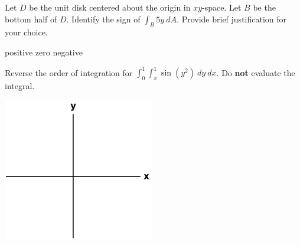 \documentclass[12pt,letterpaper,noanswers]{exam}
\begin{document}
 \pdfpageheight 11in 
  \pdfpagewidth 8.5in



\begin{questions}
\item Let $D$ be the unit disk centered about the origin in $xy$-space.  Let $B$ be the bottom half of $D$.  Identify the sign of $\displaystyle\int_B 5y\ dA$.  Provide brief justification for your choice.

\begin{oneparcheckboxes}
\choice positive
\choice zero
\choice negative
\end{oneparcheckboxes}

\vfill

\item Reverse the order of integration for 
$\displaystyle\int_0^1\int_{x}^1 \sin(y^2)\ dy\ dx$.  Do \textbf{not} evaluate the integral.

\includegraphics[height=2.5in]{img/C02axes-2.png}

\vfill

\end{questions}
\end{document}
